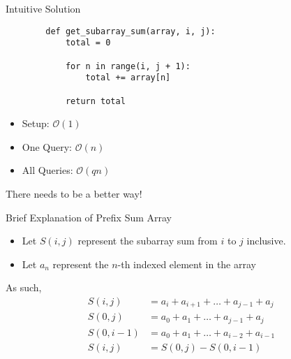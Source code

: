 \documentclass{beamer}
\begin{document}
\begin{frame}[fragile]{Intuitive Solution}
    \begin{lstlisting}
        def get_subarray_sum(array, i, j):
            total = 0
            
            for n in range(i, j + 1):
                total += array[n]
            
            return total
    \end{lstlisting}
    
    \begin{itemize}
        \item Setup: $\mathcal{O}(1)$
        \item One Query: $\mathcal{O}(n)$
        \item All Queries: $\mathcal{O}(qn)$
    \end{itemize}
    
    There needs to be a better way!
\end{frame}

\begin{frame}{Brief Explanation of Prefix Sum Array}
    \begin{itemize}
        \item Let $S(i, j)$ represent the subarray sum from $i$ to $j$ inclusive. \\
        \item Let $a_n$ represent the $n$-th indexed element in the array
    \end{itemize}
    
    As such, 
    \begin{align*}
        S(i, j) & = a_{i} + a_{i + 1} + \dots + a_{j - 1} + a_{j} \\
        S(0, j) & = a_{0} + a_{1} + \dots + a_{j - 1} + a_{j} \\
        S(0, i - 1) & = a_{0} + a_{1} + \dots + a_{i - 2} + a_{i - 1} \\
        S(i, j) & = S(0, j) - S(0, i - 1)
    \end{align*}
    
    
\end{frame}
\end{document}
